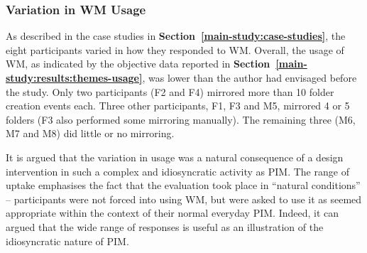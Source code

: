 \subsubsection{Variation in WM Usage}
As described in the case studies in \textbf{Section~\ref{main-study:case-studies}}, the eight participants varied in how they responded to WM.  %
Overall, the usage of WM, as indicated by the objective data reported in \textbf{Section~\ref{main-study:results:themes-usage}}, was lower than the author had envisaged before the study.  Only two participants (F2 and F4) mirrored more than 10 folder creation events each.  Three other participants, F1, F3 and M5, mirrored 4 or 5 folders (F3 also performed some mirroring manually).  The remaining three (M6, M7 and M8) did little or no mirroring.

It is argued that the variation in usage was a natural consequence of a design intervention in such a complex and idiosyncratic activity as PIM.  The range of uptake emphasises the fact that the evaluation took place in ``natural conditions'' -- participants were not forced into using WM, but were asked to use it as seemed appropriate within the context of their normal everyday PIM.  Indeed, it can argued that the wide range of responses is useful as an illustration of the idiosyncratic nature of PIM. 



